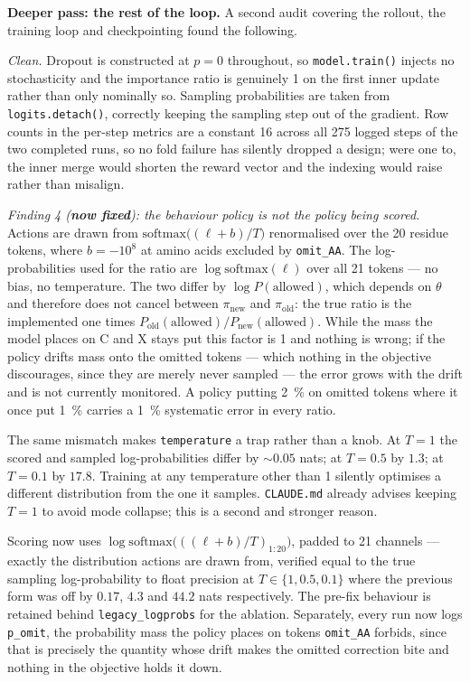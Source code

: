 \textbf{Deeper pass: the rest of the loop.} A second audit covering the rollout,
the training loop and checkpointing found the following.

\emph{Clean.} Dropout is constructed at $p = 0$ throughout, so
\texttt{model.train()} injects no stochasticity and the importance ratio is
genuinely 1 on the first inner update rather than only nominally so. Sampling
probabilities are taken from \texttt{logits.detach()}, correctly keeping the
sampling step out of the gradient. Row counts in the per-step metrics are a
constant 16 across all 275 logged steps of the two completed runs, so no fold
failure has silently dropped a design; were one to, the inner merge would
shorten the reward vector and the indexing would raise rather than misalign.

\emph{Finding 4 (\textbf{now fixed}): the behaviour policy is not the policy
being scored.} Actions
are drawn from $\mathrm{softmax}\bigl((\ell + b)/T\bigr)$ renormalised over the
20 residue tokens, where $b = -10^{8}$ at amino acids excluded by
\texttt{omit\_AA}. The log-probabilities used for the ratio are
$\log\mathrm{softmax}(\ell)$ over all 21 tokens --- no bias, no temperature. The
two differ by $\log P(\text{allowed})$, which depends on $\theta$ and therefore
does not cancel between $\pi_{\mathrm{new}}$ and $\pi_{\mathrm{old}}$: the true
ratio is the implemented one times
$P_{\mathrm{old}}(\text{allowed}) / P_{\mathrm{new}}(\text{allowed})$. While the
mass the model places on C and X stays put this factor is 1 and nothing is
wrong; if the policy drifts mass onto the omitted tokens --- which nothing in
the objective discourages, since they are merely never sampled --- the error
grows with the drift and is not currently monitored. A policy putting
\SI{2}{\percent} on omitted tokens where it once put \SI{1}{\percent} carries a
\SI{1}{\percent} systematic error in every ratio.

The same mismatch makes \texttt{temperature} a trap rather than a knob. At
$T = 1$ the scored and sampled log-probabilities differ by ${\sim}0.05$ nats; at
$T = 0.5$ by $1.3$; at $T = 0.1$ by $17.8$. Training at any temperature other
than 1 silently optimises a different distribution from the one it samples.
\texttt{CLAUDE.md} already advises keeping $T = 1$ to avoid mode collapse; this
is a second and stronger reason.

Scoring now uses
$\log\mathrm{softmax}\bigl(((\ell + b)/T)_{1:20}\bigr)$, padded to 21
channels --- exactly the distribution actions are drawn from, verified equal to
the true sampling log-probability to float precision at $T \in \{1, 0.5, 0.1\}$
where the previous form was off by $0.17$, $4.3$ and $44.2$ nats respectively.
The pre-fix behaviour is retained behind \texttt{legacy\_logprobs} for the
ablation. Separately, every run now logs \texttt{p\_omit}, the probability mass
the policy places on tokens \texttt{omit\_AA} forbids, since that is precisely
the quantity whose drift makes the omitted correction bite and nothing in the
objective holds it down.

